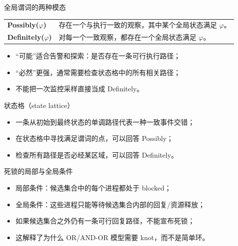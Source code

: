 \documentclass[UTF8,fontset=none,aspectratio=169,10pt]{beamer}
\begin{document}
\begin{frame}{全局谓词的两种模态}
\begin{tabularx}{\linewidth}{>{\bfseries}p{2.8cm}X}
\toprule
Possibly($\varphi$) & 存在一个与执行一致的观察，其中某个全局状态满足 $\varphi$。 \\
Definitely($\varphi$) & 对每一个一致观察，都存在一个全局状态满足 $\varphi$。 \\
\bottomrule
\end{tabularx}
\vfill
\begin{itemize}
  \item “可能”适合告警和探索：是否存在一条可行执行路径；
  \item “必然”更强，通常需要检查状态格中的所有相关路径；
  \item 不能把一次监控采样直接当成 Definitely。
\end{itemize}
\end{frame}

\begin{frame}{状态格（state lattice）}
\begin{center}
\end{center}
\begin{itemize}
  \item 一条从初始到最终状态的单调路径代表一种一致事件交错；
  \item 在状态格中寻找满足谓词的点，可以回答 Possibly；
  \item 检查所有路径是否必经某区域，可以回答 Definitely。
\end{itemize}
\end{frame}


\begin{frame}{死锁的局部与全局条件}
\begin{itemize}
  \item 局部条件：候选集合中的每个进程都处于 blocked；
  \item 全局条件：这些进程只能等待候选集合内部的回复/资源释放；
  \item 如果候选集合之外仍有一条可行回复路径，不能宣布死锁；
  \item 这解释了为什么 OR/AND-OR 模型需要 knot，而不是简单环。
\end{itemize}
\end{frame}
\end{document}
